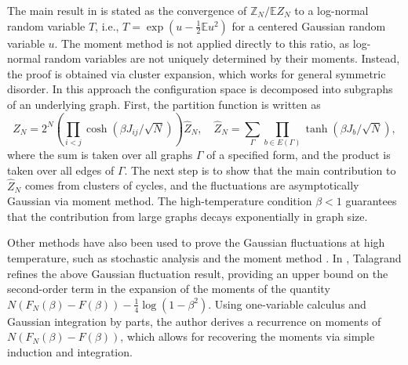 \documentclass[11pt]{article}
\numberwithin{equation}{section}
\def \Z {\mathbb{Z}}
\def \b {\beta}
\newcommand{\bE}{\mathbb{E}}
\theoremstyle{remark}
\begin{document}
The main result in \cite{AizenmanLebowitzRuelle} is stated as the convergence of $\Z_N/\bE Z_N$ to a log-normal random variable $T$, i.e., $T = \exp(u - \frac12 \bE u^2)$ for a centered Gaussian random variable $u$. The moment method is not applied directly to this ratio, as log-normal random variables are not uniquely determined by their moments. Instead, the proof is obtained via cluster expansion, which works for general symmetric disorder. In this approach the configuration space is decomposed into subgraphs of an underlying graph. First, the partition function is written as
\[
Z_N = 2^N \left(\prod_{i<j} \cosh(\b J_{ij}/ \sqrt{N}) \right) \hat{Z}_N, \quad 
\hat{Z}_N = \sum_{\Gamma} \prod_{b \in E(\Gamma)} \tanh(\b J_b/\sqrt N),
\]
where the sum is taken over all graphs $\Gamma$ of a specified form, and the product is taken over all edges of $\Gamma$. The next step is to show that the main contribution to $\hat{Z}_N$ comes from clusters of cycles, and the fluctuations are asymptotically Gaussian via moment method. The high-temperature condition $\b<1$ guarantees that the contribution from large graphs decays exponentially in graph size.

Other methods have also been used to prove the Gaussian fluctuations at high temperature, such as stochastic analysis \cite{FrohlochZegarlinski, CometsNeveu} and the moment method \cite{Talagrandvol2}. In \cite[Chapter 11]{Talagrandvol2}, Talagrand refines the above Gaussian fluctuation result, providing an upper bound on the second-order term in the expansion of the moments of the quantity $N(F_N(\b) - F(\b)) - \frac14 \log(1-\b^2)$. Using one-variable calculus and Gaussian integration by parts, the author derives a recurrence on moments of $N(F_N(\b) - F(\b))$, which allows for recovering the moments via simple induction and integration. 
\end{document}
